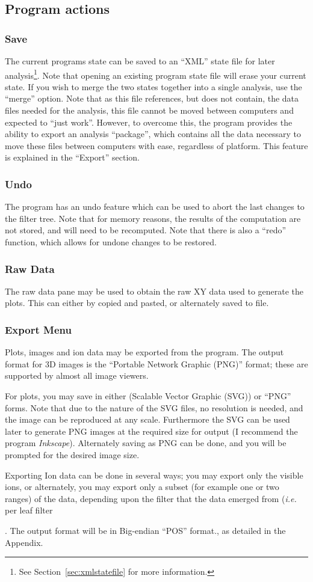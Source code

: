 \documentclass[10pt]{article}
\begin{document}
{\subsection{Program actions}

\subsubsection{Save}
The current programs state can be saved to an ``XML'' state file for later analysis\footnote{See Section~\ref{sec:xmlstatefile} for more information.}. Note that opening an existing program state file will erase your current state. If you wish to merge the two states together into a single analysis, use the ``merge'' option. Note that as this file references, but does not contain, the data files needed for the analysis, this file cannot be moved between computers and expected to ``just work''. However, to overcome this, the program provides the ability to export an analysis ``package'', which contains all the data necessary to move these files between computers with ease, regardless of platform. This feature is explained in the ``Export'' section.

\subsubsection{Undo}
The program has an undo feature which can be used to abort the last changes to the filter tree. Note that for memory reasons, the results of the computation are not stored, and will need to be recomputed. Note that there is also a ``redo'' function, which allows for undone changes to be restored. 

\subsubsection{Raw Data}
The raw data pane may be used to obtain the raw XY data used to generate the plots. This can either by copied and pasted, or alternately saved to file.  

\subsubsection{Export Menu}
Plots, images and ion data may be exported from the program. The output format for 3D images is the ``Portable Network Graphic (PNG)'' format; these are supported by almost all image viewers. 

For plots, you may save in either (Scalable Vector Graphic (SVG)) or ``PNG'' forms. Note that due to the nature of the SVG files, no resolution is needed, and the image can be reproduced at any scale. Furthermore the SVG can be used later to generate PNG images at the required size for output (I recommend the program \textit{Inkscape}). Alternately saving as PNG can be done, and you will be prompted for the desired image size.

Exporting Ion data can be done in several ways; you may export only the visible ions, or alternately, you may export only a subset (for example one or two ranges) of the data, depending upon the filter that the data emerged from (\emph{i.e.} per leaf filter}. The output format will be in Big-endian ``POS'' format., as  detailed in the Appendix.
\end{document}
